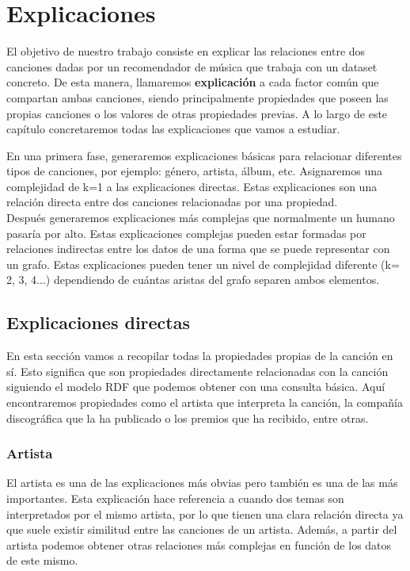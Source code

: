 \chapter{Explicaciones}
\label{cap:descripcionTrabajo}

El objetivo de nuestro trabajo consiste en explicar las relaciones entre dos canciones dadas por un recomendador de música que trabaja con un dataset concreto. De esta manera, llamaremos \textbf{explicación} a cada factor común que compartan ambas canciones, siendo principalmente propiedades que poseen las propias canciones o los valores de otras propiedades previas. A lo largo de este capítulo concretaremos todas las explicaciones que vamos a estudiar.

En una primera fase, generaremos explicaciones básicas para relacionar diferentes tipos de canciones, por ejemplo: género, artista, álbum, etc. Asignaremos una complejidad de k=1 a las explicaciones directas. Estas explicaciones son una relación directa entre dos canciones relacionadas por una propiedad.\\

Después generaremos explicaciones más complejas que normalmente un humano pasaría por alto. Estas explicaciones complejas pueden estar formadas por relaciones indirectas entre los datos de una forma que se puede representar con un grafo. Estas explicaciones pueden tener un nivel de complejidad diferente (k= 2, 3, 4...) dependiendo de cuántas aristas del grafo separen ambos elementos.\\


\section{Explicaciones directas}

En esta sección vamos a recopilar todas la propiedades propias de la canción en sí. Esto significa que son propiedades directamente relacionadas con la canción siguiendo el modelo RDF que podemos obtener con una consulta básica. Aquí encontraremos propiedades como el artista que interpreta la canción, la compañía discográfica que la ha publicado o los premios que ha recibido, entre otras.


\subsection*{Artista}

El artista es una de las explicaciones más obvias pero también es una de las más importantes. Esta explicación hace referencia a cuando dos temas son interpretados por el mismo artista, por lo que tienen una clara relación directa ya que suele existir similitud entre las canciones de un artista. Además, a partir del artista podemos obtener otras relaciones más complejas en función de los datos de este mismo.

